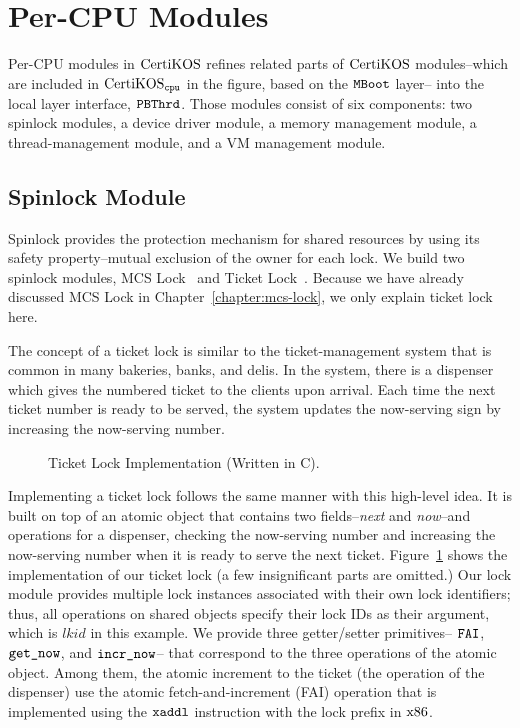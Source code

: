 \section{Per-CPU Modules}
\label{chapter:certikos:sec:per-cpu-modules}

Per-CPU modules in $\mathrm{CertiKOS}$  refines related parts of  $\mathrm{CertiKOS}$ modules--which are included in $\mathrm{CertiKOS}_{{\mathrm{\texttt{cpu}}}}$ in the figure, based on the ${\mathrm{\texttt{MBoot}}}$ layer-- 
into the local layer interface, ${{\mathrm{\texttt{PBThrd}}}}$.
Those modules consist of six components:
two spinlock modules, a device driver module, a memory management module,  a thread-management module, and a VM management module. 

\subsection{Spinlock Module}
\label{chapter:certikos:subsec:spinlock-module}

Spinlock provides the protection mechanism for shared resources by using its safety property--mutual exclusion of the owner for each lock. 
We build two spinlock modules, 
MCS Lock~\cite{mcs91} and Ticket Lock~\cite{lwn:ticketlocks}.
Because we have already discussed MCS Lock in Chapter~\ref{chapter:mcs-lock}, 
we only explain ticket lock here.

The concept of a ticket lock is similar to the ticket-management system that is common in many bakeries, banks, and delis. 
In the system, 
there is a dispenser which gives the numbered ticket to the clients upon arrival. 
Each time the next ticket number is ready to 
be served, 
the system updates the now-serving sign by increasing the now-serving number. 
\begin{figure}
 
\caption{Ticket Lock Implementation (Written in C).}
\label{fig:chapter:certikos:ticket-lock-example}
\end{figure}
Implementing a ticket lock follows the same manner with this high-level idea.
It is built on top of an atomic object that contains two fields--\textit{next} and \textit{now}--and operations for a dispenser, checking the now-serving number and increasing the now-serving number when
it is ready to serve the next ticket. 
Figure~\ref{fig:chapter:certikos:ticket-lock-example} shows the implementation of our ticket lock (a few insignificant parts are omitted.)
Our lock module provides multiple lock instances associated with their own lock identifiers;
thus, all operations on shared objects specify their lock IDs as their argument, which is $lkid$ in this example.
We provide three getter/setter primitives-- ${\mathrm{\texttt{FAI}}}$, ${\mathrm{\texttt{get\_now}}}$, and ${\mathrm{\texttt{incr\_now}}}$--
that correspond to the three operations of the atomic object.
Among them, the atomic increment to the ticket (the operation of the dispenser) 
use the atomic fetch-and-increment (FAI) operation that is implemented using the ${\mathrm{\texttt{xaddl}}}$ instruction with the 
lock prefix in $\mathrm{x86}$.

